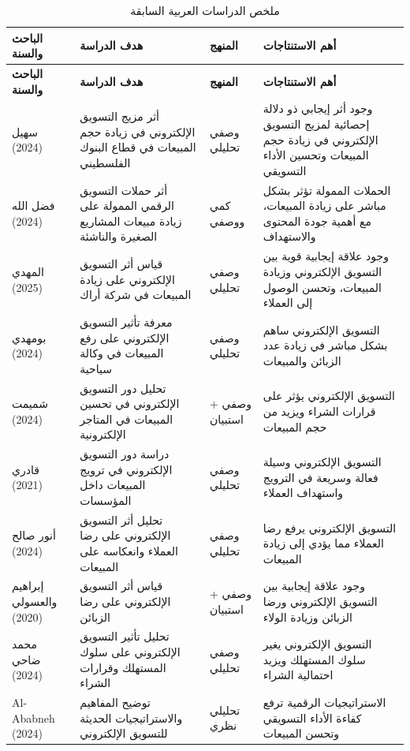 \documentclass[12pt, a4paper]{report}
\newcommand{\lr}[1]{\textenglish{#1}}
\begin{document}
\begin{longtable}{|p{3cm}|p{4cm}|p{2.5cm}|p{4.5cm}|}
\caption{ملخص الدراسات العربية السابقة}\label{tab:arabic_studies}\\
\hline
\rowcolor{tableheader}
\textbf{الباحث والسنة} & \textbf{هدف الدراسة} & \textbf{المنهج} & \textbf{أهم الاستنتاجات} \\
\hline
\endfirsthead
\hline
\rowcolor{tableheader}
\textbf{الباحث والسنة} & \textbf{هدف الدراسة} & \textbf{المنهج} & \textbf{أهم الاستنتاجات} \\
\hline
\endhead

سهيل (2024) & أثر مزيج التسويق الإلكتروني في زيادة حجم المبيعات في قطاع البنوك الفلسطيني & وصفي تحليلي & وجود أثر إيجابي ذو دلالة إحصائية لمزيج التسويق الإلكتروني في زيادة حجم المبيعات وتحسين الأداء التسويقي \\
\hline
فضل الله (2024) & أثر حملات التسويق الرقمي الممولة على زيادة مبيعات المشاريع الصغيرة والناشئة & كمي ووصفي & الحملات الممولة تؤثر بشكل مباشر على زيادة المبيعات، مع أهمية جودة المحتوى والاستهداف \\
\hline
المهدي (2025) & قياس أثر التسويق الإلكتروني على زيادة المبيعات في شركة أراك & وصفي تحليلي & وجود علاقة إيجابية قوية بين التسويق الإلكتروني وزيادة المبيعات، وتحسن الوصول إلى العملاء \\
\hline
بومهدي (2024) & معرفة تأثير التسويق الإلكتروني على رفع المبيعات في وكالة سياحية & وصفي تحليلي & التسويق الإلكتروني ساهم بشكل مباشر في زيادة عدد الزبائن والمبيعات \\
\hline
شميمت (2024) & تحليل دور التسويق الإلكتروني في تحسين المبيعات في المتاجر الإلكترونية & وصفي + استبيان & التسويق الإلكتروني يؤثر على قرارات الشراء ويزيد من حجم المبيعات \\
\hline
قادري (2021) & دراسة دور التسويق الإلكتروني في ترويج المبيعات داخل المؤسسات & وصفي تحليلي & التسويق الإلكتروني وسيلة فعالة وسريعة في الترويج واستهداف العملاء \\
\hline
أنور صالح (2024) & تحليل أثر التسويق الإلكتروني على رضا العملاء وانعكاسه على المبيعات & وصفي تحليلي & التسويق الإلكتروني يرفع رضا العملاء مما يؤدي إلى زيادة المبيعات \\
\hline
إبراهيم والعسولي (2020) & قياس أثر التسويق الإلكتروني على رضا الزبائن & وصفي + استبيان & وجود علاقة إيجابية بين التسويق الإلكتروني ورضا الزبائن وزيادة الولاء \\
\hline
محمد ضاحي (2024) & تحليل تأثير التسويق الإلكتروني على سلوك المستهلك وقرارات الشراء & وصفي تحليلي & التسويق الإلكتروني يغير سلوك المستهلك ويزيد احتمالية الشراء \\
\hline
\lr{Al-Ababneh} (2024) & توضيح المفاهيم والاستراتيجيات الحديثة للتسويق الإلكتروني & تحليلي نظري & الاستراتيجيات الرقمية ترفع كفاءة الأداء التسويقي وتحسن المبيعات \\
\hline
\end{longtable}
\end{document}
